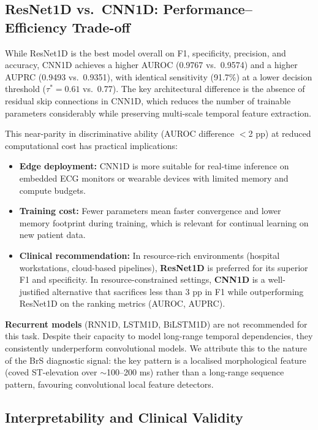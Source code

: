 \documentclass[journal, 10pt, twoside]{IEEEtran}
\begin{document}
\subsection{ResNet1D vs.\ CNN1D: Performance--Efficiency Trade-off}
\label{sec:cnn_vs_resnet}

While ResNet1D is the best model overall on F1, specificity, precision,
and accuracy, CNN1D achieves a higher AUROC (0.9767 vs.\ 0.9574) and
a higher AUPRC (0.9493 vs.\ 0.9351), with identical sensitivity (91.7\%)
at a lower decision threshold ($\tau^* = 0.61$ vs.\ 0.77).
The key architectural difference is the absence of residual skip
connections in CNN1D, which reduces the number of trainable parameters
considerably while preserving multi-scale temporal feature extraction.

This near-parity in discriminative ability (AUROC difference $<$2 pp)
at reduced computational cost has practical implications:

\begin{itemize}
  \item \textbf{Edge deployment:} CNN1D is more suitable for real-time
        inference on embedded ECG monitors or wearable devices with
        limited memory and compute budgets.
  \item \textbf{Training cost:} Fewer parameters mean faster
        convergence and lower memory footprint during training,
        which is relevant for continual learning on new patient data.
  \item \textbf{Clinical recommendation:} In resource-rich environments
        (hospital workstations, cloud-based pipelines), \textbf{ResNet1D}
        is preferred for its superior F1 and specificity.
        In resource-constrained settings, \textbf{CNN1D} is a well-justified
        alternative that sacrifices less than 3 pp in F1 while
        outperforming ResNet1D on the ranking metrics (AUROC, AUPRC).
\end{itemize}

\textbf{Recurrent models} (RNN1D, LSTM1D, BiLSTM1D) are not recommended
for this task. Despite their capacity to model long-range temporal
dependencies, they consistently underperform convolutional models.
We attribute this to the nature of the BrS diagnostic signal:
the key pattern is a localised morphological feature (coved ST-elevation
over $\sim$100--200 ms) rather than a long-range sequence pattern,
favouring convolutional local feature detectors.

\subsection{Interpretability and Clinical Validity}
\end{document}
